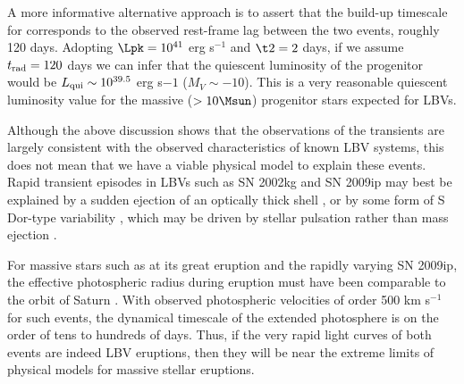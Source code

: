 A more informative alternative approach is to assert that the build-up
timescale for \spock corresponds to the observed rest-frame lag
between the two events, roughly 120 days. Adopting $\Lpk=10^{41}$ erg
s$^{-1}$ and $\t2=2$ days, if we assume $t_{\rm rad}=120$ days we can
infer that the quiescent luminosity of the \spock progenitor would be
$L_{\rm qui}\sim10^{39.5}$ erg s${-1}$ ($M_V\sim-10$).  This is a very
reasonable quiescent luminosity value for the massive ($>10\Msun$)
progenitor stars expected for LBVs.

Although the above discussion shows that the observations of the
\spock transients are largely consistent with the observed
characteristics of known LBV systems, this does not mean that we have
a viable physical model to explain these events. Rapid transient
episodes in LBVs such as SN 2002kg and SN 2009ip may best be explained
by a sudden ejection of an optically thick shell
\citep[e.g.,]{Smith:2010,Smith:2011b}, or by some form of S Dor-type
variability \citep{Weis:2005,VanDyk:2006,Foley:2011}, which may be
driven by stellar pulsation rather than mass ejection
\citep{VanGenderen:1997,VanGenderen:2001}.

For massive stars such as \etacar at its great eruption and the
rapidly varying SN 2009ip, the effective photospheric radius during
eruption must have been comparable to the orbit of Saturn
\citep[$10^{14}$ cm;][]{Davidson:1997,Smith:2011,Foley:2011}.  With
observed photospheric velocities of order 500 km s$^{-1}$ for such
events, the dynamical timescale of the extended photosphere is on the
order of tens to hundreds of days.  Thus, if the very rapid light curves
of both \spock events are indeed LBV eruptions, then they will be near the extreme limits of physical models for massive stellar eruptions.  

